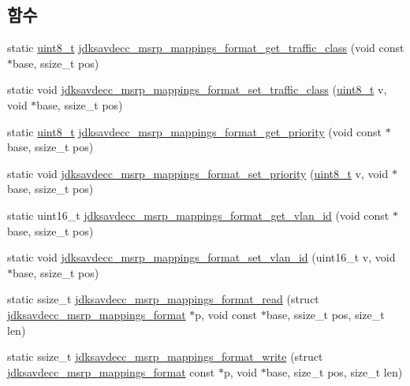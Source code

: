 \subsection*{함수}
\begin{DoxyCompactItemize}
\item 
static \hyperlink{stdint_8h_aba7bc1797add20fe3efdf37ced1182c5}{uint8\+\_\+t} \hyperlink{group__msrp__mappings__format_ga36383f5d5db3a07921dc2711eceebea9}{jdksavdecc\+\_\+msrp\+\_\+mappings\+\_\+format\+\_\+get\+\_\+traffic\+\_\+class} (void const $\ast$base, ssize\+\_\+t pos)
\item 
static void \hyperlink{group__msrp__mappings__format_ga9c9a6072c62d4b48cf33c1b79b0d305e}{jdksavdecc\+\_\+msrp\+\_\+mappings\+\_\+format\+\_\+set\+\_\+traffic\+\_\+class} (\hyperlink{stdint_8h_aba7bc1797add20fe3efdf37ced1182c5}{uint8\+\_\+t} v, void $\ast$base, ssize\+\_\+t pos)
\item 
static \hyperlink{stdint_8h_aba7bc1797add20fe3efdf37ced1182c5}{uint8\+\_\+t} \hyperlink{group__msrp__mappings__format_gad9e1418b7d0b6eb270b264809c1a48af}{jdksavdecc\+\_\+msrp\+\_\+mappings\+\_\+format\+\_\+get\+\_\+priority} (void const $\ast$base, ssize\+\_\+t pos)
\item 
static void \hyperlink{group__msrp__mappings__format_gadd45e131f83c4fe001f929c730c7dbaa}{jdksavdecc\+\_\+msrp\+\_\+mappings\+\_\+format\+\_\+set\+\_\+priority} (\hyperlink{stdint_8h_aba7bc1797add20fe3efdf37ced1182c5}{uint8\+\_\+t} v, void $\ast$base, ssize\+\_\+t pos)
\item 
static uint16\+\_\+t \hyperlink{group__msrp__mappings__format_ga2aae8fb990633570010e5bfb863e1b93}{jdksavdecc\+\_\+msrp\+\_\+mappings\+\_\+format\+\_\+get\+\_\+vlan\+\_\+id} (void const $\ast$base, ssize\+\_\+t pos)
\item 
static void \hyperlink{group__msrp__mappings__format_ga1152bffb44746ced7445236ca5aa5bf8}{jdksavdecc\+\_\+msrp\+\_\+mappings\+\_\+format\+\_\+set\+\_\+vlan\+\_\+id} (uint16\+\_\+t v, void $\ast$base, ssize\+\_\+t pos)
\item 
static ssize\+\_\+t \hyperlink{group__msrp__mappings__format_ga1a58afb7a513efbd40a69b0ebf5d5276}{jdksavdecc\+\_\+msrp\+\_\+mappings\+\_\+format\+\_\+read} (struct \hyperlink{structjdksavdecc__msrp__mappings__format}{jdksavdecc\+\_\+msrp\+\_\+mappings\+\_\+format} $\ast$p, void const $\ast$base, ssize\+\_\+t pos, size\+\_\+t len)
\item 
static ssize\+\_\+t \hyperlink{group__msrp__mappings__format_gadc1f271d0e1ddcdfd3a6aa38bbc3cd73}{jdksavdecc\+\_\+msrp\+\_\+mappings\+\_\+format\+\_\+write} (struct \hyperlink{structjdksavdecc__msrp__mappings__format}{jdksavdecc\+\_\+msrp\+\_\+mappings\+\_\+format} const $\ast$p, void $\ast$base, size\+\_\+t pos, size\+\_\+t len)
\end{DoxyCompactItemize}


